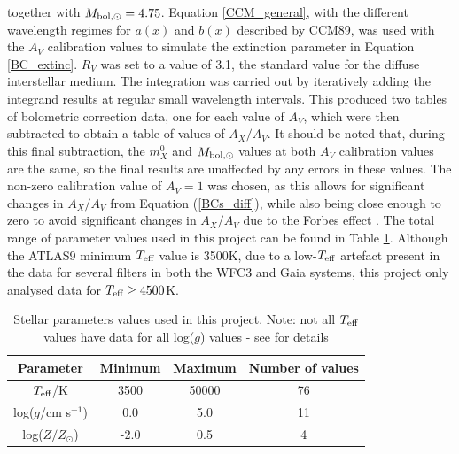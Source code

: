 \documentclass[12pt, a4paper]{report}
\begin{document}
together with $M_{\textnormal{bol},\odot} = 4.75$. Equation \ref{CCM_general}, with the different wavelength regimes for $a(x)$ and $b(x)$ described by CCM89, was used with the $A_{V}$ calibration values to simulate the extinction parameter in Equation \ref{BC_extinc}. $R_{V}$ was set to a value of 3.1, the standard value for the diffuse interstellar medium. The integration was carried out by iteratively adding the integrand results at regular small wavelength intervals. This produced two tables of bolometric correction data, one for each value of $A_{V}$, which were then subtracted to obtain a table of values of $A_{X}/A_{V}$. It should be noted that, during this final subtraction, the $m_{X}^{0}$ and $M_{\textnormal{bol},\odot}$ values at both $A_{V}$ calibration values are the same, so the final results are unaffected by any errors in these values. The non-zero calibration value of $A_{V} = 1$ was chosen, as this allows for significant changes in $A_{X}/A_{V}$ from Equation (\ref{BCs_diff}), while also being close enough to zero to avoid significant changes in $A_{X}/A_{V}$ due to the Forbes effect \citep{2008PASP..120..583G}. The total range of parameter values used in this project can be found in Table \ref{param_range_table}. Although the ATLAS9 minimum $T_{\textnormal{eff}}$ value is 3500K, due to a low-$T_{\textnormal{eff}}$ artefact present in the data for several filters in both the WFC3 and Gaia systems, this project only analysed data for $T_{\textnormal{eff}} \geq 4500$K. 

\begin{table}
\begin{tabular}{cccc}
\hline
Parameter & Minimum & Maximum & Number of values\\
\hline
$T_{\textnormal{eff}}$/K & 3500 & 50000 & 76 \\
log($g$/cm s$^{-1}$) & 0.0 & 5.0 & 11 \\
log($Z/Z_{\odot}$) & -2.0 & 0.5 & 4 \\
\hline

\end{tabular}
\caption{Stellar parameters values used in this project. Note: not all $T_{\textnormal{eff}}$ values have data for all log($g$) values - see \cite{2004astro.ph..5087C} for details}
\label{param_range_table}
\end{table}
\end{document}
